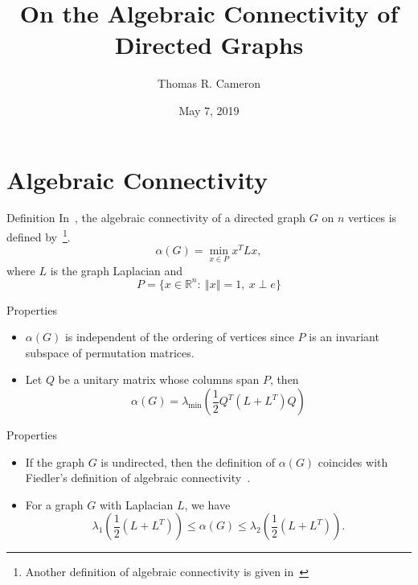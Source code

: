\documentclass{beamer}
\title{On the Algebraic Connectivity of Directed Graphs}
\author{Thomas R. Cameron}
\institute{Davidson College}
\date{May 7, 2019}
\newcommand\norm[1]{\left\Vert#1\right\Vert}
\begin{document}
\begin{frame}
	\titlepage
\end{frame}


\section{Algebraic Connectivity}

\begin{frame}{Definition}
In~\cite{Wu2005-1}, the algebraic connectivity of a directed graph $G$ on $n$ vertices is defined by~\footnote{Another definition of algebraic connectivity is given in~\cite{Wu2005-2}}.
\vfill
\[
\alpha(G) = \min_{x\in P}x^{T}Lx,
\]
\vfill
where $L$ is the graph Laplacian and
\vfill
\[
P= \{x\in\mathbb{R}^{n}\colon~\norm{x}=1,~x\perp e\}
\]
\end{frame}

\begin{frame}{Properties}
\begin{itemize}
\item	$\alpha(G)$ is independent of the ordering of vertices since $P$ is an invariant subspace of permutation matrices.
\vfill
\item	Let $Q$ be a unitary matrix whose columns span $P$, then
	\[
	\alpha(G) = \lambda_{\text{min}}\left(\frac{1}{2}Q^{T}\left(L+L^{T}\right)Q\right)
	\]
\end{itemize}
\end{frame}

\begin{frame}{Properties}
\begin{itemize}
\item	If the graph $G$ is undirected, then the definition of $\alpha(G)$ coincides with Fiedler's definition of algebraic connectivity~\cite{Fiedler1973}.
\vfill
\item For a graph $G$ with Laplacian $L$, we have
	\[
	\lambda_{1}\left(\frac{1}{2}\left(L+L^{T}\right)\right)\leq\alpha(G)\leq\lambda_{2}\left(\frac{1}{2}\left(L+L^{T}\right)\right).
	\]	
\end{itemize}
\end{frame}
\end{document}
